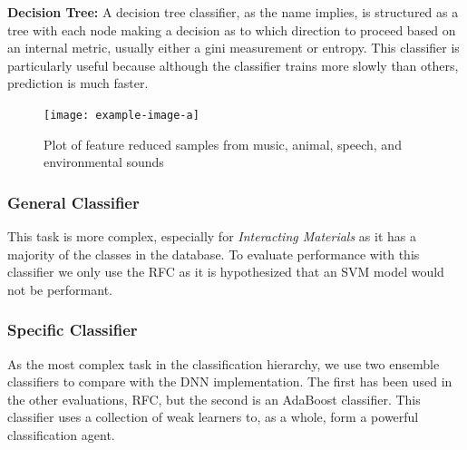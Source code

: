 \textbf{Decision Tree: } A decision tree classifier, as the name implies, is structured as a tree with each node making a decision as to which direction to proceed based on an internal metric, usually either a gini measurement or entropy. This classifier is particularly useful because although the classifier trains more slowly than others, prediction is much faster.

\begin{figure}
    \centering
    \texttt{[image: example-image-a]}
    \caption{Plot of feature reduced samples from music, animal, speech, and environmental sounds}
    \label{fig:top-dist}
\end{figure}

\subsubsection{General Classifier}
This task is more complex, especially for \textit{Interacting Materials} as it
has a majority of the classes in the database. To evaluate performance with this
classifier we only use the RFC as it is hypothesized that an SVM model would not
be performant.

\subsubsection{Specific Classifier}
As the most complex task in the classification hierarchy, we use two ensemble
classifiers to compare with the DNN implementation. The first has been used in
the other evaluations, RFC, but the second is an AdaBoost classifier. This
classifier uses a collection of weak learners to, as a whole, form a powerful
classification agent.

